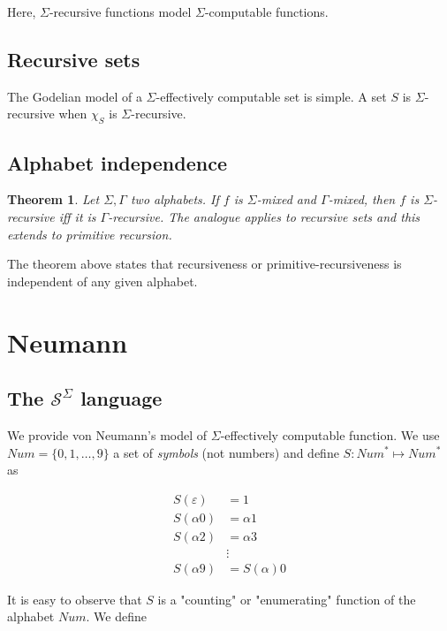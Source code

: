 \documentclass[a4paper, 12pt]{article}
\newtheorem{theorem}{Theorem}
\newtheorem{theorem}{Theorem}
\begin{document}
Here, $\Sigma$-recursive functions model $\Sigma$-computable functions.

\subsection{Recursive sets}

The Godelian model of a $\Sigma$-effectively computable set is simple. A set $S$
is $\Sigma$-recursive when $\chi_{S}$ is $\Sigma$-recursive.

\subsection{Alphabet independence}

\begin{theorem} Let $\Sigma, \Gamma$ two alphabets. If $f$ is $\Sigma$-mixed and
$\Gamma$-mixed, then $f$ is $\Sigma$-recursive iff it is $\Gamma$-recursive. The
analogue applies to recursive sets and this extends to primitive recursion.
\end{theorem}

The theorem above states that recursiveness or primitive-recursiveness is
independent of any given alphabet.


\pagebreak 

\section{Neumann}

\subsection{The $\mathcal{S}^{\Sigma}$ language}

We provide von Neumann's model of $\Sigma$-effectively computable function. We
use $Num = \{0, 1, \ldots, 9\}$ a set of \textit{symbols} (not numbers) and
define $S : Num^{*} \mapsto Num^{*}$ as 

\begin{align*}
    S(\varepsilon) &= 1 \\
    S(\alpha 0) &= \alpha 1 \\
    S(\alpha 2) &= \alpha 3 \\
                &\vdots \\ 
    S(\alpha 9) &= S(\alpha) 0
\end{align*}

It is easy to observe that $S$ is a "counting" or "enumerating" function of the
alphabet $Num$. We define 
\end{document}
